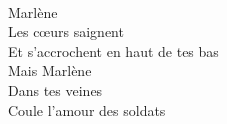 \\
Marlène\\
Les cœurs saignent\\
Et s'accrochent en haut de tes bas\\
Mais Marlène\\
Dans tes veines\\
Coule l'amour des soldats\\
